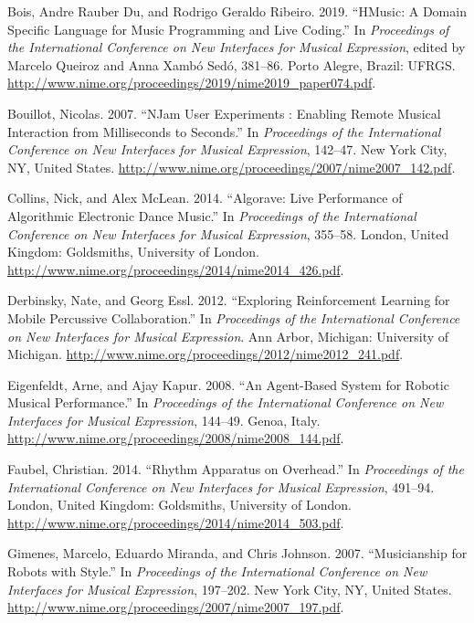 \documentclass[
]{article}
\newlength{\cslhangindent}
\newenvironment{cslreferences}%
  {\setlength{\parindent}{0pt}%
  \everypar{\setlength{\hangindent}{\cslhangindent}}\ignorespaces}%
  {\par}
\begin{document}
\hypertarget{refs}{}
\begin{cslreferences}
\leavevmode\hypertarget{ref-Rauber-Du-Bois2019}{}%
Bois, Andre Rauber Du, and Rodrigo Geraldo Ribeiro. 2019. ``HMusic: A
Domain Specific Language for Music Programming and Live Coding.'' In
\emph{Proceedings of the International Conference on New Interfaces for
Musical Expression}, edited by Marcelo Queiroz and Anna Xambó Sedó,
381--86. Porto Alegre, Brazil: UFRGS.
\url{http://www.nime.org/proceedings/2019/nime2019_paper074.pdf}.

\leavevmode\hypertarget{ref-Bouillot2007}{}%
Bouillot, Nicolas. 2007. ``NJam User Experiments : Enabling Remote
Musical Interaction from Milliseconds to Seconds.'' In \emph{Proceedings
of the International Conference on New Interfaces for Musical
Expression}, 142--47. New York City, NY, United States.
\url{http://www.nime.org/proceedings/2007/nime2007_142.pdf}.

\leavevmode\hypertarget{ref-ncollins2014}{}%
Collins, Nick, and Alex McLean. 2014. ``Algorave: Live Performance of
Algorithmic Electronic Dance Music.'' In \emph{Proceedings of the
International Conference on New Interfaces for Musical Expression},
355--58. London, United Kingdom: Goldsmiths, University of London.
\url{http://www.nime.org/proceedings/2014/nime2014_426.pdf}.

\leavevmode\hypertarget{ref-Derbinsky2012}{}%
Derbinsky, Nate, and Georg Essl. 2012. ``Exploring Reinforcement
Learning for Mobile Percussive Collaboration.'' In \emph{Proceedings of
the International Conference on New Interfaces for Musical Expression}.
Ann Arbor, Michigan: University of Michigan.
\url{http://www.nime.org/proceedings/2012/nime2012_241.pdf}.

\leavevmode\hypertarget{ref-Eigenfeldt2008}{}%
Eigenfeldt, Arne, and Ajay Kapur. 2008. ``An Agent-Based System for
Robotic Musical Performance.'' In \emph{Proceedings of the International
Conference on New Interfaces for Musical Expression}, 144--49. Genoa,
Italy. \url{http://www.nime.org/proceedings/2008/nime2008_144.pdf}.

\leavevmode\hypertarget{ref-cfaubel12014}{}%
Faubel, Christian. 2014. ``Rhythm Apparatus on Overhead.'' In
\emph{Proceedings of the International Conference on New Interfaces for
Musical Expression}, 491--94. London, United Kingdom: Goldsmiths,
University of London.
\url{http://www.nime.org/proceedings/2014/nime2014_503.pdf}.

\leavevmode\hypertarget{ref-Gimenes2007}{}%
Gimenes, Marcelo, Eduardo Miranda, and Chris Johnson. 2007.
``Musicianship for Robots with Style.'' In \emph{Proceedings of the
International Conference on New Interfaces for Musical Expression},
197--202. New York City, NY, United States.
\url{http://www.nime.org/proceedings/2007/nime2007_197.pdf}.


\end{cslreferences}
\end{document}
